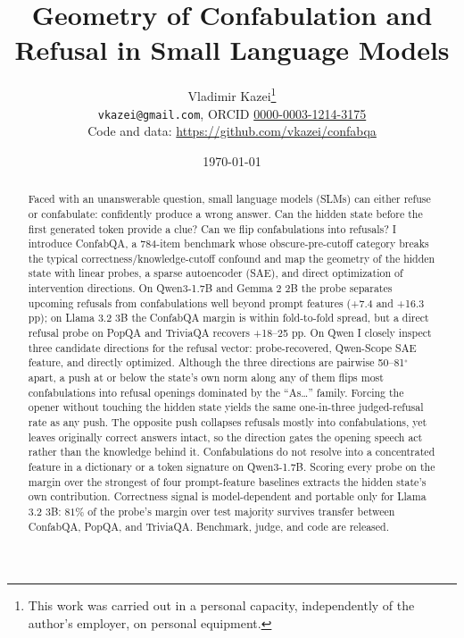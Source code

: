 \documentclass[
  10pt,
  letterpaper,
]{article}
\title{Geometry of Confabulation and Refusal in Small Language Models}
\author{Vladimir Kazei\thanks{This work was carried out in a personal capacity, independently of the author's employer, on personal equipment.}\\
\texttt{vkazei@gmail.com}, ORCID \href{https://orcid.org/0000-0003-1214-3175}{0000-0003-1214-3175}\\
Code and data: \url{https://github.com/vkazei/confabqa}}
\date{\today}
\begin{document}
\maketitle
\begin{abstract}
Faced with an unanswerable question, small language models (SLMs) can either refuse or confabulate: confidently produce a wrong answer.
Can the hidden state before the first generated token provide a clue?
Can we flip confabulations into refusals?
I introduce ConfabQA, a 784-item benchmark whose obscure-pre-cutoff category breaks the typical correctness/knowledge-cutoff confound
and map the geometry of the hidden state with linear probes, a sparse autoencoder (SAE), and direct optimization of intervention directions.
On Qwen3-1.7B and Gemma 2 2B the probe separates upcoming refusals from confabulations well beyond prompt features (+7.4 and +16.3 pp); on Llama 3.2 3B the ConfabQA margin is within fold-to-fold spread, but a direct refusal probe on PopQA and TriviaQA recovers +18--25 pp.
On Qwen I closely inspect three candidate directions for the refusal vector: probe-recovered, Qwen-Scope SAE feature, and directly optimized.
Although the three directions are pairwise 50--81\(^\circ\) apart, a push at or below the state's own norm along any of them flips most confabulations into refusal openings dominated by the ``As\ldots'' family.
Forcing the opener without touching the hidden state yields the same one-in-three judged-refusal rate as any push.
The opposite push collapses refusals mostly into confabulations, yet leaves originally correct answers intact, so the direction gates the opening speech act rather than the knowledge behind it.
Confabulations do not resolve into a concentrated feature in a dictionary or a token signature on Qwen3-1.7B.
Scoring every probe on the margin over the strongest of four prompt-feature baselines extracts the hidden state's own contribution.
Correctness signal is model-dependent and portable only for Llama 3.2 3B: \(81\%\) of the probe's margin over test majority survives transfer between ConfabQA, PopQA, and TriviaQA.
Benchmark, judge, and code are released.
\end{abstract}

















\end{document}

